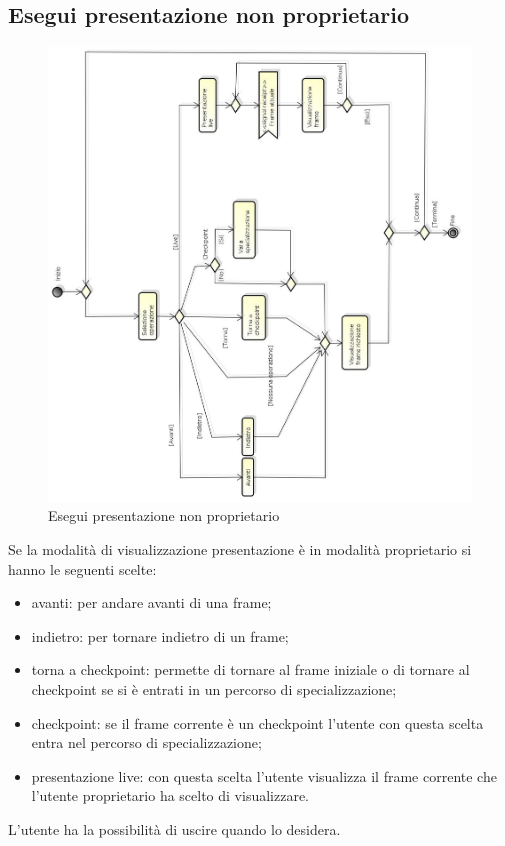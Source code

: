\newpage

\subsection{Esegui presentazione non proprietario}

\begin{figure}[h!]
		\centering
		\includegraphics[scale=.4]{img/Esegui_presentazione_non_proprietario.jpg}
		\caption{Esegui presentazione non proprietario}		\label{fig:Esegui_presentazione_non_proprietario}
\end{figure}

Se la modalità di visualizzazione presentazione è in modalità proprietario si hanno le seguenti scelte: 
\begin{itemize}
\item
avanti: per andare avanti di una frame; 
\item 
indietro: per tornare indietro di un frame;
\item torna a checkpoint: permette di tornare al frame iniziale o di tornare al checkpoint se si è entrati in un percorso di specializzazione; 
\item checkpoint: se il frame corrente è un checkpoint l'utente con questa scelta entra nel percorso di specializzazione;
\item presentazione live: con questa scelta l'utente visualizza il frame corrente che l'utente proprietario ha scelto di visualizzare.
\end{itemize}
L'utente ha la possibilità di uscire quando lo desidera.

